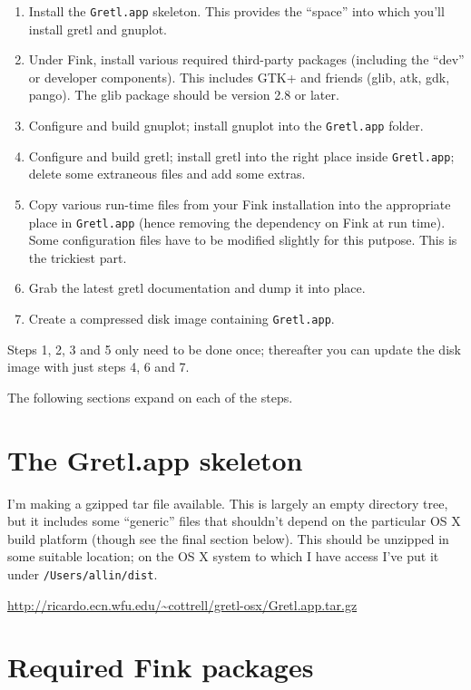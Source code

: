 \documentclass{article}
\begin{document}
\begin{enumerate}
\item Install the \texttt{Gretl.app} skeleton.  This provides the
  ``space'' into which you'll install gretl and gnuplot.
\item Under Fink, install various required third-party packages
  (including the ``dev'' or developer components).  This includes
  GTK+ and friends (glib, atk, gdk, pango).  The glib package
  should be version 2.8 or later.
\item Configure and build gnuplot; install gnuplot into
  the \texttt{Gretl.app} folder.
\item Configure and build gretl; install gretl into the right place
  inside \texttt{Gretl.app}; delete some extraneous files and add some
  extras.
\item Copy various run-time files from your Fink installation into the
  appropriate place in \texttt{Gretl.app} (hence removing the
  dependency on Fink at run time).  Some configuration files have to
  be modified slightly for this putpose.  This is the trickiest part.
\item Grab the latest gretl documentation and dump it into place.
\item Create a compressed disk image containing \texttt{Gretl.app}.
\end{enumerate}

Steps 1, 2, 3 and 5 only need to be done once; thereafter you can
update the disk image with just steps 4, 6 and 7.

The following sections expand on each of the steps.

\section{The Gretl.app skeleton}

I'm making a gzipped tar file available.  This is largely an empty
directory tree, but it includes some ``generic'' files that shouldn't
depend on the particular OS X build platform (though see the final
section below).  This should be unzipped in some suitable location; on
the OS X system to which I have access I've put it under
\texttt{/Users/allin/dist}.

\url{http://ricardo.ecn.wfu.edu/~cottrell/gretl-osx/Gretl.app.tar.gz}

\section{Required Fink packages}
\end{document}
